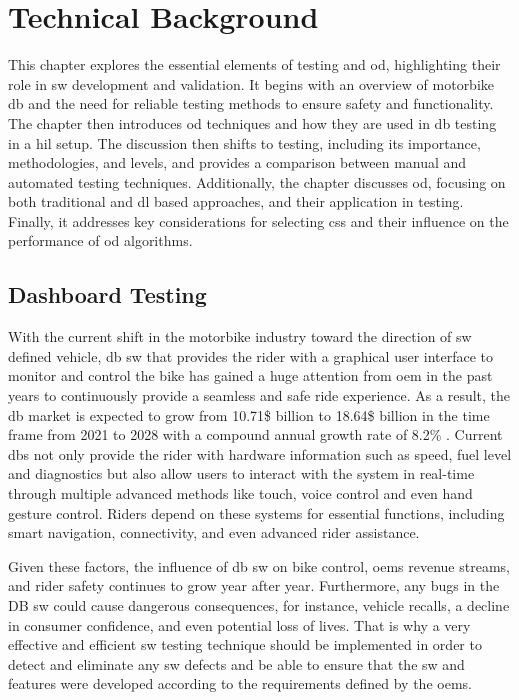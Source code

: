 \chapter{Technical Background}
This chapter explores the essential elements of testing and \gls{od}, highlighting their role in \gls{sw} development and validation. It begins with an overview of motorbike \gls{db} and the need for reliable testing methods to ensure safety and functionality. The chapter then introduces \gls{od} techniques and how they are used in \gls{db} testing in a \gls{hil} setup. The discussion then shifts to testing, including its importance, methodologies, and levels, and provides a comparison between manual and automated testing techniques. Additionally, the chapter discusses \gls{od}, focusing on both traditional and \gls{dl} based approaches, and their application in testing. Finally, it addresses key considerations for selecting \gls{cs}s and their influence on the performance of \gls{od} algorithms.

\section{Dashboard Testing}
With the current shift in the motorbike industry toward the direction of \gls{sw} defined vehicle, \gls{db} \gls{sw} that provides the rider with a graphical user interface to monitor and control the bike has gained a huge attention from \gls{oem} in the past years to continuously provide a seamless and safe ride experience. As a result, the \gls{db} market is expected to grow from 10.71\$ billion to 18.64\$ billion in the time frame from 2021 to 2028 with a compound annual growth rate of 8.2\% \cite{DL_HMI_SW_V}. Current \gls{db}s not only provide the rider with hardware information such as speed, fuel level and diagnostics but also allow users to interact with the system in real-time through multiple advanced methods like touch, voice control and even hand gesture control.  Riders depend on these systems for essential functions, including smart navigation, connectivity, and even advanced rider assistance.

Given these factors, the influence of \gls{db} \gls{sw} on bike control, \gls{oem}s revenue streams, and rider safety continues to grow year after year. Furthermore, any bugs in the DB \gls{sw} could cause dangerous consequences, for instance, vehicle recalls, a decline in consumer confidence, and even potential loss of lives. That is why a very effective and efficient \gls{sw} testing technique should be implemented in order to detect and eliminate any \gls{sw} defects and be able to ensure that the \gls{sw} and features were developed according to the requirements defined by the \gls{oem}s.

